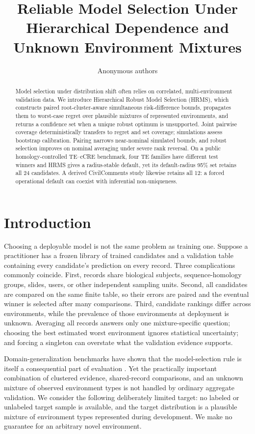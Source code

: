 \documentclass{article}
\title{Reliable Model Selection Under Hierarchical Dependence and Unknown Environment Mixtures}
\author{Anonymous authors}
\begin{document}
\maketitle

\begin{abstract}
Model selection under distribution shift often relies on correlated, multi-environment validation data.  We introduce Hierarchical Robust Model Selection (HRMS), which constructs paired root-cluster-aware simultaneous risk-difference bounds, propagates them to worst-case regret over plausible mixtures of represented environments, and returns a confidence set when a unique robust optimum is unsupported.  Joint pairwise coverage deterministically transfers to regret and set coverage; simulations assess bootstrap calibration.  Pairing narrows near-nominal simulated bounds, and robust selection improves on nominal averaging under severe rank reversal.  On a public homology-controlled TE--cCRE benchmark, four TE families have different test winners and HRMS gives a radius-stable default, yet its default-radius 95\% set retains all 24 candidates.  A derived CivilComments study likewise retains all 12: a forced operational default can coexist with inferential non-uniqueness.
\end{abstract}

\section{Introduction}
\label{sec:intro}

Choosing a deployable model is not the same problem as training one.  Suppose a practitioner has a frozen library of trained candidates and a validation table containing every candidate's prediction on every record.  Three complications commonly coincide.  First, records share biological subjects, sequence-homology groups, slides, users, or other independent sampling units.  Second, all candidates are compared on the same finite table, so their errors are paired and the eventual winner is selected after many comparisons.  Third, candidate rankings differ across environments, while the prevalence of those environments at deployment is unknown.  Averaging all records answers only one mixture-specific question; choosing the best estimated worst environment ignores statistical uncertainty; and forcing a singleton can overstate what the validation evidence supports.

Domain-generalization benchmarks have shown that the model-selection rule is itself a consequential part of evaluation \citep{gulrajani2021domainbed}.  Yet the practically important combination of clustered evidence, shared-record comparisons, and an unknown mixture of observed environment types is not handled by ordinary aggregate validation.  We consider the following deliberately limited target: no labeled or unlabeled target sample is available, and the target distribution is a plausible mixture of environment types represented during development.  We make no guarantee for an arbitrary novel environment.
\end{document}
